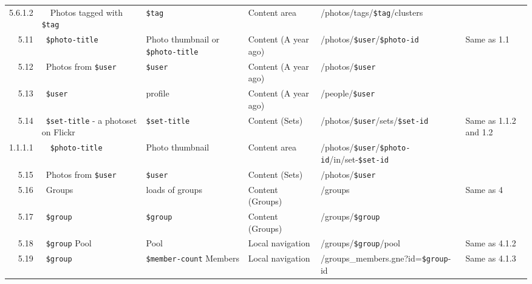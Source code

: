 \documentclass[11pt,a4paper]{article}
\newcommand{\var}[1]{\texttt{\${#1}}}
\begin{document}
\begin{table}[h!b!p!]
\begin{center}
\begin{tiny}
\begin{tabular}{r|l|l|l|l|p{3cm}}
                5.6.1.2 &
                ~~Photos tagged with \var{tag} &
                \var{tag} &
                Content area &
                /photos/tags/\var{tag}/clusters &
                \\

              5.11 &
              ~\var{photo-title} &
              Photo thumbnail or \var{photo-title} &
              Content (A year ago) &
              /photos/\var{user}/\var{photo-id} &
              Same as 1.1 \\

              5.12 &
              ~Photos from \var{user} &
              \var{user} &
              Content (A year ago) &
              /photos/\var{user} &
              \\

              5.13 &
              ~\var{user} &
              profile &
              Content (A year ago) &
              /people/\var{user} &
              \\

              5.14 &
              ~\var{set-title} - a photoset on Flickr &
              \var{set-title} &
              Content (Sets) &
              /photos/\var{user}/sets/\var{set-id} &
              Same as 1.1.2 and 1.2 \\

                1.1.1.1 &
                ~~\var{photo-title} &
                Photo thumbnail &
                Content area &
                /photos/\var{user}/\var{photo-id}/in/set-\var{set-id} &
                \\

              5.15 &
              ~Photos from \var{user} &
              \var{user} &
              Content (Sets) &
              /photos/\var{user} &
              \\

              5.16 &
              ~Groups &
              loads of groups &
              Content (Groups) &
              /groups &
              Same as 4\\

              5.17 &
              ~\var{group} &
              \var{group} &
              Content (Groups) &
              /groups/\var{group} &
              \\

              5.18 &
              ~\var{group} Pool &
              Pool &
              Local navigation &
              /groups/\var{group}/pool &
              Same as 4.1.2 \\

              5.19 &
              ~\var{group}  &
              \var{member-count} Members &
              Local navigation &
              /groups\_members.gne?id=\var{group}-id &
              Same as 4.1.3 \\

          \end{tabular}
        \rm
      \end{tiny}
    \end{center}
  \end{table}
\end{document}

